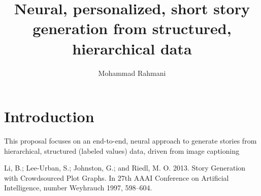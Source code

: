 \documentclass{article}
\begin{document}
	
	\title{Neural, personalized, short story generation from structured, hierarchical data}
	\author{Mohammad Rahmani}
	\maketitle
	\section{Introduction}
	\par This proposal focuses on an end-to-end, neural approach to generate stories from hierarchical, structured (labeled values) data, driven from image captioning \citep{wikipedia-script-graph} 
	
	\begin{thebibliography}{1}
		
		Li, B.; Lee-Urban, S.; Johnston, G.; and Riedl, M. O. 
		2013. 
		Story Generation with Crowdsourced Plot Graphs. 
		In 27th AAAI Conference on Artificial Intelligence, number Weyhrauch 1997, 598–604.
	
	\end{thebibliography}
\end{document}
